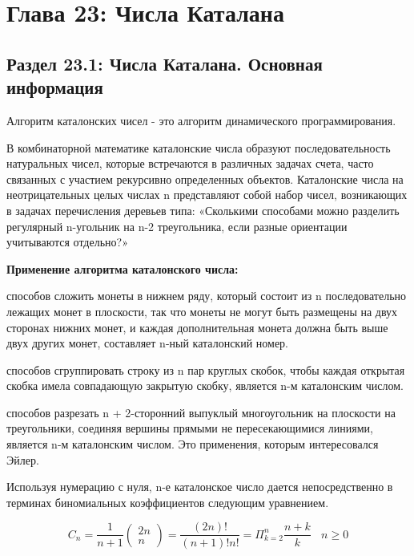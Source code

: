 
\chapter*{Глава 23: Числа Каталана}
\section*{Раздел 23.1: Числа Каталана. Основная информация}
\vspace{\baselineskip}
Алгоритм каталонских чисел - это алгоритм динамического программирования.

В комбинаторной математике каталонские числа образуют последовательность натуральных чисел, которые встречаются в различных задачах счета, часто связанных с участием рекурсивно определенных объектов. Каталонские числа на неотрицательных целых числах n представляют собой набор чисел, возникающих в задачах перечисления деревьев типа: «Сколькими способами можно разделить регулярный n-угольник на n-2 треугольника, если разные ориентации учитываются отдельно?»

\vspace{\baselineskip}
\textbf{Применение алгоритма каталонского числа:}
\begin{itemize}
 способов сложить монеты в нижнем ряду, который состоит из n последовательно лежащих монет в плоскости, так что монеты не могут быть размещены на двух сторонах нижних монет, и каждая дополнительная монета должна быть выше двух других монет, составляет n-ный каталонский номер.

 способов сгруппировать строку из n пар круглых скобок, чтобы каждая открытая скобка имела совпадающую закрытую скобку, является n-м каталонским числом.

 способов разрезать n + 2-сторонний выпуклый многоугольник на плоскости на треугольники, соединяя вершины прямыми не пересекающимися линиями, является n-м каталонским числом. Это применения, которым интересовался Эйлер.
\end{itemize}

Используя нумерацию с нуля, n-е каталонское число дается непосредственно в терминах биномиальных коэффициентов следующим уравнением.

\vspace{\baselineskip}
\begin{tcolorbox}

$$C_{n}=\frac{1}{n+1} \left(\begin{array}{crl}
2n\\
n\end{array}\right)=\frac{(2n)!}{(n+1)!n!} = \Pi^{n}_{k=2} \frac{n+k}{k} ~~~~ n \geq 0$$

\end{tcolorbox}

